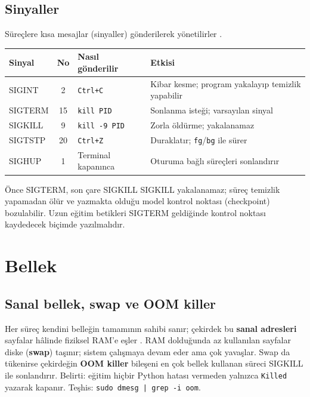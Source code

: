 \documentclass[11pt,a4paper]{article}
\begin{document}
\subsection{Sinyaller}
Süreçlere kısa mesajlar (sinyaller) gönderilerek yönetilirler \cite{signal7}.
\begin{center}
\begin{tabularx}{\textwidth}{@{}l c l Y@{}}
\toprule
\textbf{Sinyal} & \textbf{No} & \textbf{Nasıl gönderilir} & \textbf{Etkisi} \\
\midrule
SIGINT & 2 & \texttt{Ctrl+C} & Kibar kesme; program yakalayıp temizlik yapabilir \\
SIGTERM & 15 & \texttt{kill PID} & Sonlanma isteği; varsayılan sinyal \\
SIGKILL & 9 & \texttt{kill -9 PID} & Zorla öldürme; yakalanamaz \\
SIGTSTP & 20 & \texttt{Ctrl+Z} & Duraklatır; \texttt{fg}/\texttt{bg} ile sürer \\
SIGHUP & 1 & Terminal kapanınca & Oturuma bağlı süreçleri sonlandırır \\
\bottomrule
\end{tabularx}
\end{center}
\begin{uyari}{Önce SIGTERM, son çare SIGKILL}
SIGKILL yakalanamaz; süreç temizlik yapamadan ölür ve yazmakta olduğu model kontrol noktası (checkpoint) bozulabilir. Uzun eğitim betikleri SIGTERM geldiğinde kontrol noktası kaydedecek biçimde yazılmalıdır.
\end{uyari}

\section{Bellek}

\subsection{Sanal bellek, swap ve OOM killer}
Her süreç kendini belleğin tamamının sahibi sanır; çekirdek bu \textbf{sanal adresleri} sayfalar hâlinde fiziksel RAM'e eşler \cite{kernelmm}. RAM dolduğunda az kullanılan sayfalar diske (\textbf{swap}) taşınır; sistem çalışmaya devam eder ama çok yavaşlar. Swap da tükenirse çekirdeğin \textbf{OOM killer} bileşeni en çok bellek kullanan süreci SIGKILL ile sonlandırır. Belirti: eğitim hiçbir Python hatası vermeden yalnızca \texttt{Killed} yazarak kapanır. Teşhis: \texttt{sudo dmesg | grep -i oom}.
\end{document}

